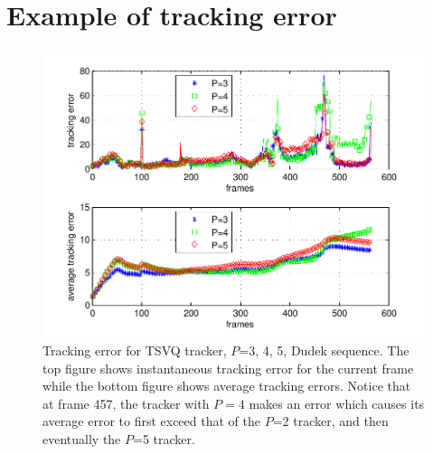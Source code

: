 \clearpage
\newpage
\section{Example of tracking error}
\label{App:TSVQ_Dudek_example}
\begin{figure}[h!]
\centering
\includegraphics[width=1.0\textwidth]{thesis/Dudek_TSVQ_errors.pdf}
\caption{Tracking error for TSVQ tracker, $P$=3, 4, 5, Dudek sequence.  The top figure shows instantaneous tracking error for the current frame while the bottom figure shows average tracking errors.  Notice that at frame 457, the tracker with $P=4$ makes an error which causes its average error to first exceed that of the $P$=2 tracker, and then eventually the $P$=5 tracker.}
\label{fig:results_TSVQ_Dudek_errors}
\end{figure}

